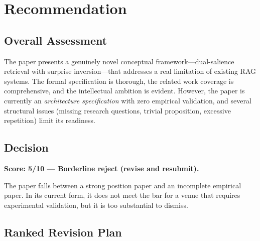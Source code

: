 \documentclass[11pt,a4paper]{article}
\begin{document}
\section{Recommendation}

\subsection{Overall Assessment}

The paper presents a genuinely novel conceptual framework---dual-salience retrieval with surprise inversion---that addresses a real limitation of existing RAG systems. The formal specification is thorough, the related work coverage is comprehensive, and the intellectual ambition is evident. However, the paper is currently an \emph{architecture specification} with zero empirical validation, and several structural issues (missing research questions, trivial proposition, excessive repetition) limit its readiness.

\subsection{Decision}

\textbf{Score: 5/10 --- Borderline reject (revise and resubmit).}

The paper falls between a strong position paper and an incomplete empirical paper. In its current form, it does not meet the bar for a venue that requires experimental validation, but it is too substantial to dismiss.

\subsection{Ranked Revision Plan}
\end{document}
